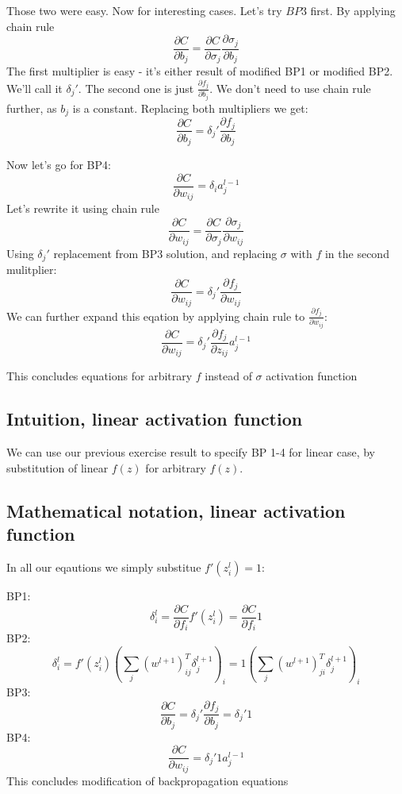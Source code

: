 \documentclass{article}
\begin{document}
Those two were easy. Now for interesting cases. Let's try $BP3$ first. By applying chain rule
$$\frac{\partial C}{\partial b_j} = \frac{\partial C}{\partial \sigma_j} \frac{\partial \sigma_j}{\partial b_j}$$
The first multiplier is easy - it's either result of modified BP1 or modified BP2. We'll call it $\delta_j'$.
The second one is just $\frac{\partial f_j}{\partial b_j}$. We don't need to use chain rule further, as $b_j$ is a constant.
Replacing both multipliers we get:
$$\frac{\partial C}{\partial b_j} = \delta_j' \frac{\partial f_j}{\partial b_j}$$

Now let's go for BP4:
$$\frac{\partial C}{\partial w_{ij}} = \delta_i a^{l-1}_{j}$$
Let's rewrite it using chain rule
$$\frac{\partial C}{\partial w_{ij}} = \frac{\partial C}{\partial \sigma_j} \frac{\partial \sigma_j}{\partial w_{ij}}$$
Using $\delta_j'$ replacement from BP3 solution, and replacing $\sigma$ with $f$ in the second mulitplier:
$$\frac{\partial C}{\partial w_{ij}} = \delta_j' \frac{\partial f_j}{\partial w_{ij}}$$
We can further expand this eqation by applying chain rule to $\frac{\partial f_j}{\partial w_{ij}}$:
$$\frac{\partial C}{\partial w_{ij}} = \delta_j' \frac{\partial f_j}{\partial z_{ij}} a^{l-1}_{j}$$

This concludes equations for arbitrary $f$ instead of $\sigma$ activation function

\subsection{Intuition, linear activation function}
We can use our previous exercise result to specify BP 1-4 for linear case, by substitution of linear $f(z)$ for arbitrary $f(z)$.
\subsection{Mathematical notation, linear activation function}
In all our eqautions we simply substitue $f'(z^l_i) = 1$:

BP1:
$$\delta^l_i = \frac{\partial C}{\partial f_i} f'(z^l_i) = \frac{\partial C}{\partial f_i}  1$$
BP2:
$$\delta^l_i = f'(z_i^l) (\sum_j(w^{l+1})^T_{ij} \delta^{l+1}_j)_i = 1  (\sum_j(w^{l+1})^T_{ji} \delta^{l+1}_j)_i$$
BP3:
$$\frac{\partial C}{\partial b_j} = \delta_j' \frac{\partial f_j}{\partial b_j} = \delta_j'  1$$
BP4:
$$\frac{\partial C}{\partial w_{ij}} = \delta_j'  1  a^{l-1}_{j}$$
This concludes modification of backpropagation equations
\end{document}
